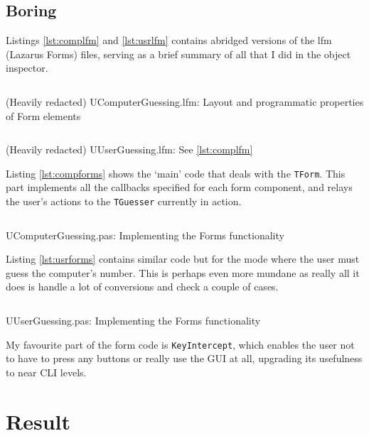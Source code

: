 \documentclass[a4paper,11pt]{article}
\begin{document}
    \subsection{Boring}

    Listings \ref{lst:complfm} and \ref{lst:usrlfm} contains abridged versions
    of the lfm (Lazarus Forms) files, serving as a brief summary of all that I
    did in the object inspector.

\begin{longlisting}
\inputminted{pascal}{UComputerGuessing.lfm}
\caption{(Heavily redacted) UComputerGuessing.lfm: Layout and programmatic
properties of Form elements}
\label{lst:complfm}
\end{longlisting}

\begin{longlisting}
\inputminted{pascal}{UUserGuessing.lfm}
\caption{(Heavily redacted) UUserGuessing.lfm: See \ref{lst:complfm}}
\label{lst:usrlfm}
\end{longlisting}

    Listing \ref{lst:compforms} shows the `main' code that deals with the
    \texttt{TForm}. This part implements all the callbacks specified for each
    form component, and relays the user's actions to the \texttt{TGuesser}
    currently in action.

\begin{longlisting}
\inputminted{Pascal}{../UComputerGuessing.pas}
\caption{UComputerGuessing.pas: Implementing the Forms functionality}
\label{lst:compforms}
\end{longlisting}

    Listing \ref{lst:usrforms} contains similar code but for the mode where the
    user must guess the computer's number. This is perhaps even more mundane as
    really all it does is handle a lot of conversions and check a couple of
    cases.

\begin{longlisting}
\inputminted{Pascal}{../UUserGuessing.pas}
\caption{UUserGuessing.pas: Implementing the Forms functionality}
\label{lst:usrforms}
\end{longlisting}

    My favourite part of the form code is \texttt{KeyIntercept}, which enables
    the user not to have to press any buttons or really use the GUI at all,
    upgrading its usefulness to near CLI levels.

    \section{Result}
\end{document}
